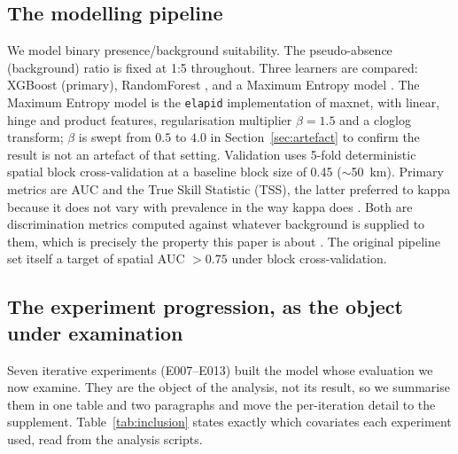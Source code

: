 \documentclass[12pt]{article}
\begin{document}
\subsection{The modelling pipeline}
\label{sec:pipeline}

We model binary presence/background suitability.
The pseudo-absence (background) ratio is fixed at 1:5 throughout.
Three learners are compared: XGBoost \citep{chen2016} (primary), RandomForest \citep{breiman2001}, and a Maximum Entropy model \citep{phillips2006, elith2006}.
The Maximum Entropy model is the \texttt{elapid} implementation of maxnet, with linear, hinge and product features, regularisation multiplier $\beta = 1.5$ and a cloglog transform; $\beta$ is swept from $0.5$ to $4.0$ in Section~\ref{sec:artefact} to confirm the result is not an artefact of that setting.
Validation uses 5-fold deterministic spatial block cross-validation at a baseline block size of 0.45\textdegree{} ($\sim$50~km).
Primary metrics are AUC and the True Skill Statistic (TSS), the latter preferred to kappa because it does not vary with prevalence in the way kappa does \citep{allouche2006}.
Both are discrimination metrics computed against whatever background is supplied to them, which is precisely the property this paper is about \citep{lobo2008, guillera2015}.
The original pipeline set itself a target of spatial AUC $> 0.75$ under block cross-validation.

\subsection{The experiment progression, as the object under examination}
\label{sec:progression}

Seven iterative experiments (E007--E013) built the model whose evaluation we now examine.
They are the object of the analysis, not its result, so we summarise them in one table and two paragraphs and move the per-iteration detail to the supplement.
Table~\ref{tab:inclusion} states exactly which covariates each experiment used, read from the analysis scripts.
\end{document}
